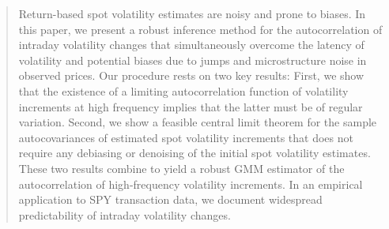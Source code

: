 \documentclass[ecta,nameyear,draft]{econsocart}
\newcommand{\1}{\mathbf 1}
\numberwithin{equation}{section}
\begin{document}
\begin{frontmatter}
	\begin{abstract} 
 Return-based spot volatility estimates  are noisy and prone to biases. In this paper, we present a robust inference method for the autocorrelation of intraday volatility changes that simultaneously overcome the latency of volatility and potential biases due to  jumps and microstructure noise in observed prices. Our procedure rests on two key results: First, we show that the existence of a limiting   autocorrelation function of volatility increments at high frequency implies that the latter must be of regular variation. Second, we show a feasible central limit theorem for the sample autocovariances of estimated spot volatility increments  that does not require any debiasing or denoising of the initial spot volatility estimates.  These two results combine  to yield a robust GMM estimator of the autocorrelation of high-frequency volatility increments. In an empirical application to SPY transaction data, we document widespread predictability of intraday volatility changes.
	\end{abstract}
	
	
	\begin{keyword}
	\end{keyword}
	
\end{frontmatter}



\end{document}
